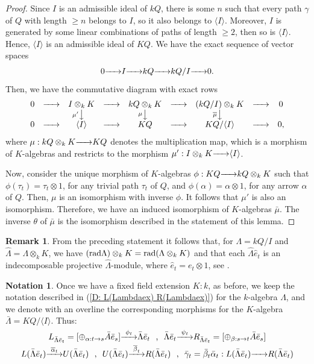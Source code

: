 \documentclass{article}
\theoremstyle{definition}
\newtheorem{remark}[theorem]{Remark}
\newtheorem{notation}[theorem]{Notation}
\newcommand{\rad}{{ \rm rad }}
\newcommand{\rightmap}[1]{\smash{\mathop{\hbox to 
20pt{\rightarrowfill}}\limits^{#1}}}
\newcommand{\shortlmapdown}[1]
{\llap{$\vcenter{\hbox{$\scriptstyle#1$}}$}\big\downarrow}
\begin{document}
\begin{proof} Since $I$ is an admissible ideal of $kQ$,  there is some $n$ such that every path $\gamma$ of $Q$ with length $\geq n$ belongs to $I$, so it also belongs to $\langle I\rangle$. Moreover, $I$ is generated by some linear combinations of  paths of length $\geq 2$, then so is $\langle I\rangle$. Hence,  $\langle I\rangle $ is an admissible ideal of $KQ$. 
We have the exact sequence of vector spaces
$$0\rightmap{}I\rightmap{}kQ\rightmap{}kQ/I\rightmap{}0.$$
Then, we have the commutative diagram with exact rows
$$\begin{matrix}0&\rightmap{}&I\otimes_kK&\rightmap{}&kQ\otimes_kK&\rightmap{}&(kQ/I)\otimes_kK&\rightmap{}&0\\
&&\shortlmapdown{\mu'}&&\shortlmapdown{\mu}&&\shortlmapdown{\overline{\mu}}&&\\
0&\rightmap{}&\langle I\rangle &\rightmap{}&KQ&\rightmap{}&KQ/\langle I\rangle&\rightmap{}&0,
\end{matrix}$$
where $\mu:kQ\otimes_kK\rightmap{}KQ$ denotes the multiplication map, which is a morphism of $K$-algebras and restricts to the morphism $\mu':I\otimes_kK\rightmap{}\langle I\rangle$. 

Now, consider the unique morphism of $K$-algebras $\phi:KQ\rightmap{}
kQ\otimes_k K$ such that $\phi(\tau_t)=\tau_t\otimes 1$, for any trivial path $\tau_t$ of $Q$, and $\phi(\alpha)=\alpha\otimes 1$, for any arrow $\alpha$ of $Q$. Then, $\mu$ is an isomorphism  with inverse $\phi$. It follows that $\mu'$ is also an isomorphism. Therefore, we have an induced isomorphism of $K$-algebras $\bar{\mu}$. The inverse $\theta$ of $\bar{\mu}$ is the isomorphism described in the statement of this lemma. 
\end{proof}

\begin{remark}\label{R: extension and radical} From the preceding statement it follows that, for $\Lambda=kQ/I$ and $\hat{\Lambda}=\Lambda\otimes_kK$, we have $(\rad\Lambda) \otimes_k K = \rad(\Lambda \otimes_k K)$  and that each $\hat{\Lambda}\hat{e}_t$ is an indecomposable projective $\hat{\Lambda}$-module, where $\hat{e}_t=e_t\otimes 1$, see \cite[(3.3)]{Kasjan}. 
\end{remark}
 
\begin{notation}\label{N: bar notation para KQ/(I)} Once we have a fixed field extension $K:k$, as before, we keep the notation described in (\ref{D: L(Lambdaex) R(Lambdaex)}) for the $k$-algebra $\Lambda$, and we denote with an overline the corresponding morphisms for the $K$-algebra $\bar{\Lambda}=KQ/\langle I\rangle$. Thus:  
$$L_{\bar{\Lambda}\bar{e}_t}=[\oplus_{\alpha:t\rightarrow  s}\bar{A}\bar{e}_s]\rightmap{\bar{\phi}_t}\bar{\Lambda}\bar{e}_t
\hbox{ \  , \  }
\bar{\Lambda}\bar{e}_t\rightmap{\bar{\psi}_t}R_{\bar{\Lambda}\bar{e}_t}=[\oplus_{\beta:s\rightarrow  t}\bar{A}\bar{e}_s]
$$
$$L(\bar{\Lambda}\bar{e}_t)\rightmap{\overline{\alpha}_t}U(\bar{\Lambda}\bar{e}_t)
\hbox{ \ , \  }
U(\bar{\Lambda}\bar{e}_t)\rightmap{\overline{\beta}_t}
R(\bar{\Lambda}\bar{e}_t)\hbox{  \ ,  \ }
\bar{\gamma}_t=\bar{\beta}_t\bar{\alpha}_t:L(\bar{\Lambda}\bar{e}_t)\rightmap{}R(\bar{\Lambda}\bar{e}_t)$$
\end{notation}
\end{document}
